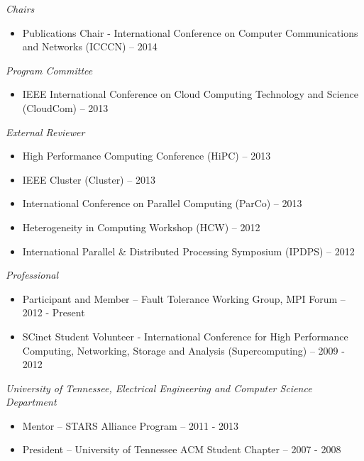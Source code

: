 {\sl Chairs}
\begin{itemize}
    \item Publications Chair - International Conference on Computer
        Communications and Networks (ICCCN) -- 2014
\end{itemize}

{\sl Program Committee}
\begin{itemize}
    \item IEEE International Conference on Cloud Computing Technology and
        Science (CloudCom) -- 2013
\end{itemize}

{\sl External Reviewer}
\begin{itemize}
    \item High Performance Computing Conference (HiPC) -- 2013
    \item IEEE Cluster (Cluster) -- 2013
    \item International Conference on Parallel Computing (ParCo) -- 2013
    \item Heterogeneity in Computing Workshop (HCW) -- 2012
    \item International Parallel \& Distributed Processing Symposium (IPDPS) -- 2012
\end{itemize}

{\sl Professional}
\begin{itemize}
    \item Participant and Member -- Fault Tolerance Working Group, MPI Forum -- 2012 - Present
    \item SCinet Student Volunteer - International Conference for High
        Performance Computing, Networking, Storage and Analysis
        (Supercomputing) -- 2009 - 2012
\end{itemize}

{\sl University of Tennessee, Electrical Engineering and Computer Science Department}
\begin{itemize}
    \item Mentor -- STARS Alliance Program -- 2011 - 2013
    \item President -- University of Tennessee ACM Student Chapter -- 2007 - 2008
\end{itemize}
